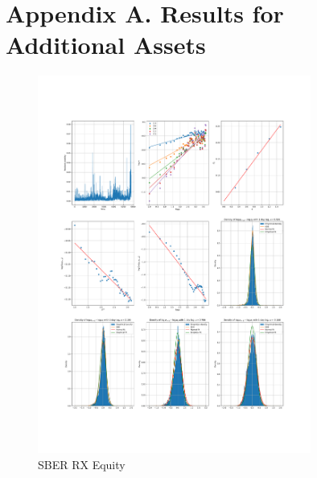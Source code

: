 
\section{Appendix A. Results for Additional Assets}
    \noindent
    \begin{figure}[h]
        \centering
        \includegraphics[width=0.8\textwidth]{fig/SBER RX Equity.pdf}
        \caption{SBER RX Equity}
    \end{figure}

